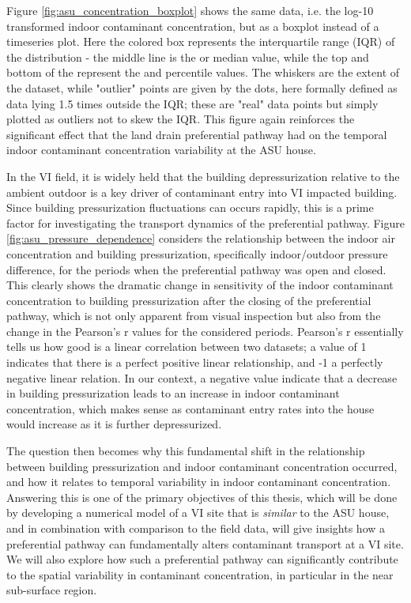 Figure \ref{fig:asu_concentration_boxplot} shows the same data, i.e. the log-10 transformed indoor contaminant concentration, but as a boxplot instead of a timeseries plot.
Here the colored box represents the interquartile range (IQR) of the distribution - the middle line is the  or median value, while the top and bottom of the represent the  and  percentile values.
The whiskers are the extent of the dataset, while "outlier" points are given by the dots, here formally defined as data lying 1.5 times outside the IQR; these are "real" data points but simply plotted as outliers not to skew the IQR.
This figure again reinforces the significant effect that the land drain preferential pathway had on the temporal indoor contaminant concentration variability at the ASU house.\par

In the VI field, it is widely held that the building depressurization relative to the ambient outdoor is a key driver of contaminant entry into VI impacted building.
Since building pressurization fluctuations can occurs rapidly, this is a prime factor for investigating the transport dynamics of the preferential pathway.
Figure \ref{fig:asu_pressure_dependence} considers the relationship between the indoor air concentration and building pressurization, specifically indoor/outdoor pressure difference, for the periods when the preferential pathway was open and closed.
This clearly shows the dramatic change in sensitivity of the indoor contaminant concentration to building pressurization after the closing of the preferential pathway, which is not only apparent from visual inspection but also from the change in the Pearson's r values for the considered periods.
Pearson's r essentially tells us how good is a linear correlation between two datasets; a value of 1 indicates that there is a perfect positive linear relationship, and -1 a perfectly negative linear relation.
In our context, a negative value indicate that a decrease in building pressurization leads to an increase in indoor contaminant concentration, which makes sense as contaminant entry rates into the house would increase as it is further depressurized.\par

The question then becomes why this fundamental shift in the relationship between building pressurization and indoor contaminant concentration occurred, and how it relates to temporal variability in indoor contaminant concentration.
Answering this is one of the primary objectives of this thesis, which will be done by developing a numerical model of a VI site that is \textit{similar} to the ASU house, and in combination with comparison to the field data, will give insights how a preferential pathway can fundamentally alters contaminant transport at a VI site.
We will also explore how such a preferential pathway can significantly contribute to the spatial variability in contaminant concentration, in particular in the near sub-surface region.\par

